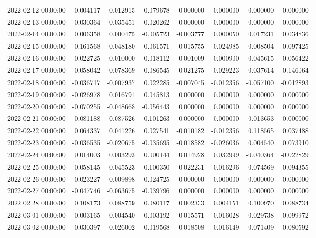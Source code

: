 \begin{tabular}{lrrrrrrr}
2022-02-12 00:00:00 & -0.004117 & 0.012915 & 0.079678 & 0.000000 & 0.000000 & 0.000000 & 0.000000 \\
2022-02-13 00:00:00 & -0.030364 & -0.035451 & -0.020262 & 0.000000 & 0.000000 & 0.000000 & 0.000000 \\
2022-02-14 00:00:00 & 0.006358 & 0.000475 & -0.005723 & -0.003777 & 0.000050 & 0.017231 & 0.034836 \\
2022-02-15 00:00:00 & 0.161568 & 0.048180 & 0.061571 & 0.015755 & 0.024985 & 0.008504 & -0.097425 \\
2022-02-16 00:00:00 & -0.022725 & -0.010000 & -0.018112 & 0.001009 & -0.000900 & -0.045615 & -0.056422 \\
2022-02-17 00:00:00 & -0.058042 & -0.078369 & -0.086545 & -0.021275 & -0.029223 & 0.037614 & 0.146064 \\
2022-02-18 00:00:00 & -0.036717 & -0.007937 & 0.022285 & -0.007045 & -0.012356 & -0.057100 & -0.012893 \\
2022-02-19 00:00:00 & -0.026978 & 0.016791 & 0.045813 & 0.000000 & 0.000000 & 0.000000 & 0.000000 \\
2022-02-20 00:00:00 & -0.070255 & -0.048668 & -0.056443 & 0.000000 & 0.000000 & 0.000000 & 0.000000 \\
2022-02-21 00:00:00 & -0.081188 & -0.087526 & -0.101263 & 0.000000 & 0.000000 & -0.013653 & 0.000000 \\
2022-02-22 00:00:00 & 0.064337 & 0.041226 & 0.027541 & -0.010182 & -0.012356 & 0.118565 & 0.037488 \\
2022-02-23 00:00:00 & -0.036535 & -0.020675 & -0.035695 & -0.018582 & -0.026036 & 0.004540 & 0.073910 \\
2022-02-24 00:00:00 & 0.014003 & 0.003293 & 0.000144 & 0.014928 & 0.032999 & -0.040364 & -0.022829 \\
2022-02-25 00:00:00 & 0.058145 & 0.045523 & 0.100350 & 0.022231 & 0.016296 & 0.074569 & -0.094355 \\
2022-02-26 00:00:00 & -0.023227 & 0.009898 & -0.024725 & 0.000000 & 0.000000 & 0.000000 & 0.000000 \\
2022-02-27 00:00:00 & -0.047746 & -0.063675 & -0.039796 & 0.000000 & 0.000000 & 0.000000 & 0.000000 \\
2022-02-28 00:00:00 & 0.108173 & 0.088759 & 0.080117 & -0.002333 & 0.004151 & -0.100970 & 0.088734 \\
2022-03-01 00:00:00 & -0.003165 & 0.004540 & 0.003192 & -0.015571 & -0.016028 & -0.029738 & 0.099972 \\
2022-03-02 00:00:00 & -0.030397 & -0.026002 & -0.019568 & 0.018508 & 0.016149 & 0.071409 & -0.080592 \\

\end{tabular}
